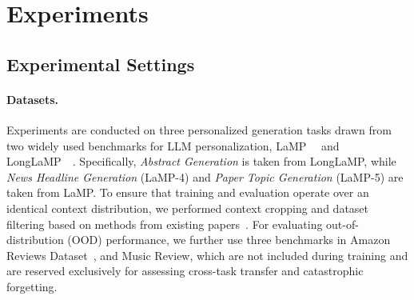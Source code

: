 \documentclass{article} %
\begin{document}
\section{Experiments}
\label{Experiments}
\subsection{Experimental Settings}
\paragraph{Datasets.}
Experiments are conducted on three personalized generation tasks drawn from two
widely used benchmarks for LLM personalization, LaMP~~\citep{lamp} and
LongLaMP~~\citep{longlamp}. Specifically, \textit{Abstract Generation} is taken from
LongLaMP, while \textit{News Headline Generation} (LaMP-4) and \textit{Paper Topic
Generation} (LaMP-5) are taken from LaMP. To ensure that training and evaluation operate over an identical context distribution, we performed context cropping and dataset filtering based on methods from existing papers~\citep{PerCE,nextquill}. For evaluating out-of-distribution (OOD) performance, we further use three benchmarks in Amazon Reviews Dataset~\citep{amazon}, and Music Review, which are not included during training and are reserved exclusively for assessing cross-task transfer and catastrophic forgetting.
\end{document}
